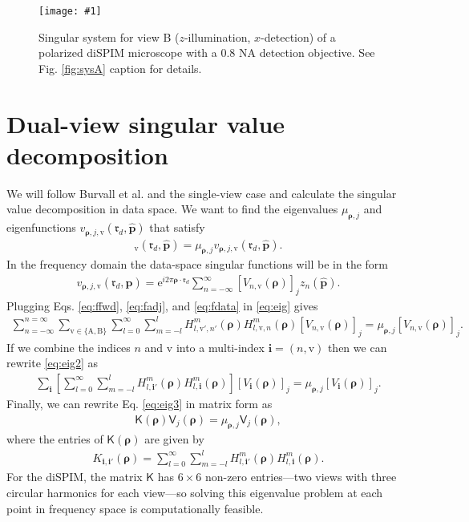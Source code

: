 \documentclass[11pt]{article}
\newcommand{\me}{\mathrm{e}}
\providecommand{\mb}[1]{\mathbf{#1}}
\providecommand{\mc}[1]{\mathcal{#1}}
\providecommand{\rd}{\mathbf{\mathfrak{r}}_d}
\providecommand{\mh}[1]{\mathbf{\hat{#1}}}
\providecommand{\ms}[1]{\mathsf{#1}}
\providecommand{\bs}[1]{\boldsymbol{#1}}
\providecommand{\tv}{\text{v}}
\providecommand{\tx}[1]{\text{#1}}
\providecommand{\bp}{\bs{\rho}}
\providecommand{\p}{\mh{p}}
\providecommand{\lmsum}{\sum_{l=0}^\infty\sum_{m=-l}^{l}}
\providecommand{\fig}[4]{
\begin{figure}[h]
 \captionsetup{width=1.0\linewidth}
 \centering
 \texttt{[image: \#1]}
 \caption{#3}
 \label{fig:#4}
\end{figure}
}
\begin{document}
\fig{../calculations/out2/SVSz.pdf}{1.0}{Singular system for view B
  ($z$-illumination, $x$-detection) of a polarized diSPIM microscope with a 0.8
  NA detection objective. See Fig. \ref{fig:sysA} caption for details. }{sysB}

\section{Dual-view singular value decomposition}
We will follow Burvall et al. \cite{burvall06} and the single-view case and
calculate the singular value decomposition in data space. We want to find the
eigenvalues $\mu_{\bp, j}$ and eigenfunctions $v_{\bp, j, \tv}(\rd, \p)$ that
satisfy
\begin{align}
  [\mc{H}\mc{H}^\dagger \mb{v}_{\bp, j}]_{\tv}(\rd, \p) = \mu_{\bp, j}v_{\bp, j, \tv}(\rd, \p). \label{eq:eig}
\end{align}
In the frequency domain the data-space singular functions will be in the form
\begin{align}
  v_{\bp, j, \tv}(\rd, \p) = \me^{i2\pi\bp\cdot\rd} \sum_{n=-\infty}^{\infty} \left[V_{n, \tv}(\bp)\right]_j z_n(\p). \label{eq:fdata}
\end{align}
Plugging Eqs. \ref{eq:ffwd}, \ref{eq:fadj}, and \ref{eq:fdata} in \ref{eq:eig} gives
\begin{align}
  \sum_{n=-\infty}^{n=\infty} \sum_{\tv \in \{\tx{A}, \tx{B}\}} \lmsum H_{l,\tv',n'}^m(\bp)H_{l,\tv,n}^m(\bp)\left[V_{n, \tv}(\bp)\right]_j = \mu_{\bp, j}\left[V_{n, \tv}(\bp)\right]_j. \label{eq:eig2}
\end{align}
If we combine the indices $n$ and $\tv$ into a multi-index $\mb{i} = (n, \tv)$ then we
can rewrite \ref{eq:eig2} as
\begin{align}
  \sum_{\mb{i}} \left[\lmsum H_{l,\mb{i}'}^m(\bp)H_{l,\mb{i}}^m(\bp)\right]\left[V_{\mb{i}}(\bp)\right]_j = \mu_{\bp, j}\left[V_{\mb{i}}(\bp)\right]_j. \label{eq:eig3}
\end{align}
Finally, we can rewrite Eq. \ref{eq:eig3} in matrix form as
\begin{align}
  \ms{K}(\bp)\ms{V}_j(\bp) = \mu_{\bp, j}\ms{V}_j(\bp),
\end{align}
where the entries of $\ms{K}(\bp)$ are given by
\begin{align}
  K_{\mb{i}, \mb{i}'} (\bp) = \lmsum H_{l,\mb{i}'}^m(\bp)H_{l,\mb{i}}^m(\bp). 
\end{align}
For the diSPIM, the matrix $\mathsf{K}$ has $6\times 6$ non-zero entries---two
views with three circular harmonics for each view---so solving this eigenvalue
problem at each point in frequency space is computationally feasible.
\end{document}
